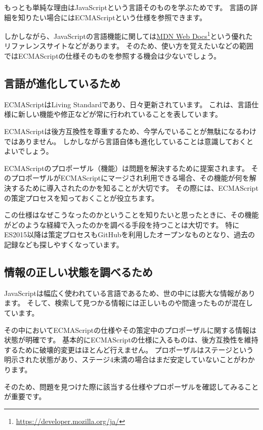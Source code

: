 もっとも単純な理由はJavaScriptという言語そのものを学ぶためです。
言語の詳細を知りたい場合にはECMAScriptという仕様を参照できます。

しかしながら、JavaScriptの言語機能に関しては\href{https://developer.mozilla.org/ja/}{MDN
Web Docs}\footnote{\url{https://developer.mozilla.org/ja/}}という優れたリファレンスサイトなどがあります。
そのため、使い方を覚えたいなどの範囲ではECMAScriptの仕様そのものを参照する機会は少ないでしょう。

\hypertarget{to-progress}{%
\subsection{言語が進化しているため}\label{to-progress}}

ECMAScriptはLiving Standardであり、日々更新されています。
これは、言語仕様に新しい機能や修正などが常に行われていることを表しています。

ECMAScriptは後方互換性を尊重するため、今学んでいることが無駄になるわけではありません。
しかしながら言語自体も進化していることは意識しておくとよいでしょう。

ECMAScriptのプロポーザル（機能）は問題を解決するために提案されます。
そのプロポーザルがECMAScriptにマージされ利用できる場合、その機能が何を解決するために導入されたのかを知ることが大切です。
その際には、ECMAScriptの策定プロセスを知っておくことが役立ちます。

この仕様はなぜこうなったのかということを知りたいと思ったときに、その機能がどのような経緯で入ったのかを調べる手段を持つことは大切です。
特にES2015以降は策定プロセスもGitHubを利用したオープンなものとなり、過去の記録なども探しやすくなっています。

\hypertarget{to-search}{%
\subsection{情報の正しい状態を調べるため}\label{to-search}}

JavaScriptは幅広く使われている言語であるため、世の中には膨大な情報があります。
そして、検索して見つかる情報には正しいものや間違ったものが混在しています。

その中においてECMAScriptの仕様やその策定中のプロポーザルに関する情報は状態が明確です。
基本的にECMAScriptの仕様に入るものは、後方互換性を維持するために破壊的変更はほとんど行えません。
プロポーザルはステージという明示された状態があり、ステージ4未満の場合はまだ安定していないことがわかります。

そのため、問題を見つけた際に該当する仕様やプロポーザルを確認してみることが重要です。

